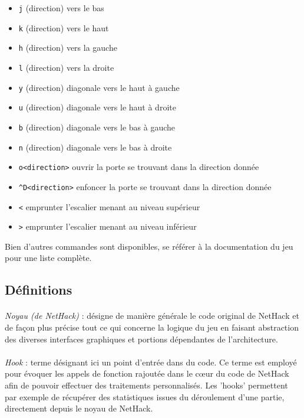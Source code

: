 \documentclass[a4paper,12pt]{article}
\begin{document}
\begin{itemize}
	\item \verb!j! (direction) vers le bas
	\item \verb!k! (direction) vers le haut
	\item \verb!h! (direction) vers la gauche
	\item \verb!l! (direction) vers la droite
	\item \verb!y! (direction) diagonale vers le haut à gauche
	\item \verb!u! (direction) diagonale vers le haut à droite
	\item \verb!b! (direction) diagonale vers le bas à gauche
	\item \verb!n! (direction) diagonale vers le bas à droite
	\item \verb!o<direction>! ouvrir la porte se trouvant dans la direction donnée
	\item \verb!^D<direction>! enfoncer la porte se trouvant dans la direction donnée
	\item \verb!<! emprunter l'escalier menant au niveau supérieur
	\item \verb!>! emprunter l'escalier menant au niveau inférieur
\end{itemize}

Bien d'autres commandes sont disponibles, se référer à la documentation du
jeu pour une liste complète.

\subsection*{Définitions}


\paragraph{}
\emph{Noyau (de NetHack)} : désigne de manière générale le code original de
NetHack et de façon plus précise tout ce qui concerne la logique du jeu en
faisant abstraction des diverses interfaces graphiques et portions dépendantes
de l'architecture.

\paragraph{}
\emph{Hook} : terme désignant ici un point d'entrée dans du code. Ce terme est
employé pour évoquer les appels de fonction rajoutée dans le cœur du code
de NetHack afin de pouvoir effectuer des traitements personnalisés. Les
'hooks' permettent par exemple de récupérer des statistiques issues du
déroulement d'une partie, directement depuis le noyau de NetHack.
\end{document}
